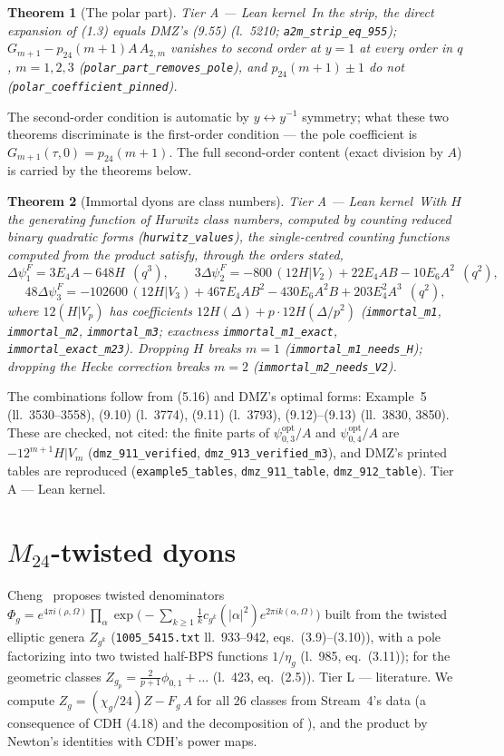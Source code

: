 \documentclass[11pt,a4paper]{article}
\newtheorem{theorem}{Theorem}[section]
\theoremstyle{remark}
\newcommand{\tierA}{\colorbox{green!15}{\textsf{\scriptsize Tier A --- Lean kernel}}}
\newcommand{\tierL}{\colorbox{blue!10}{\textsf{\scriptsize Tier L --- literature}}}
\newcommand{\lean}[1]{\texttt{#1}}
\newcommand{\Mtf}{M_{24}}
\begin{document}
\begin{theorem}[The polar part] \tierA\
In the strip, the direct expansion of (1.3) equals DMZ's (9.55) (l.~5210; \lean{a2m\_strip\_eq\_955});
$G_{m+1}-p_{24}(m+1)A\,A_{2,m}$ vanishes to second order at $y=1$ at every order in $q$, $m=1,2,3$
(\lean{polar\_part\_removes\_pole}), and $p_{24}(m+1)\pm1$ do not (\lean{polar\_coefficient\_pinned}).
\end{theorem}
The second-order condition is automatic by $y\leftrightarrow y^{-1}$ symmetry; what these two theorems
discriminate is the first-order condition --- the pole coefficient is $G_{m+1}(\tau,0)=p_{24}(m+1)$. The
full second-order content (exact division by $A$) is carried by the theorems below.

\begin{theorem}[Immortal dyons are class numbers] \tierA\
With $H$ the generating function of Hurwitz class numbers, computed by counting reduced binary quadratic
forms (\lean{hurwitz\_values}), the single-centred counting functions computed from the product satisfy,
through the orders stated,
\[
\Delta\psi_1^F=3E_4A-648H\ \ (q^3),\qquad
3\Delta\psi_2^F=-800\,(12H|V_2)+22E_4AB-10E_6A^2\ \ (q^2),
\]
\[
48\Delta\psi_3^F=-102600\,(12H|V_3)+467E_4AB^2-430E_6A^2B+203E_4^2A^3\ \ (q^2),
\]
where $12(H|V_p)$ has coefficients $12H(\Delta)+p\cdot12H(\Delta/p^2)$
(\lean{immortal\_m1}, \lean{immortal\_m2}, \lean{immortal\_m3}; exactness \lean{immortal\_m1\_exact},
\lean{immortal\_exact\_m23}). Dropping $H$ breaks $m=1$ (\lean{immortal\_m1\_needs\_H}); dropping the
Hecke correction breaks $m=2$ (\lean{immortal\_m2\_needs\_V2}).
\end{theorem}
The combinations follow from (5.16) and DMZ's optimal forms: Example~5 (ll.~3530--3558), (9.10) (l.~3774),
(9.11) (l.~3793), (9.12)--(9.13) (ll.~3830, 3850). These are checked, not cited: the finite parts of
$\psi_{0,3}^{\mathrm{opt}}/A$ and $\psi_{0,4}^{\mathrm{opt}}/A$ are $-12^{m+1}H|V_m$
(\lean{dmz\_911\_verified}, \lean{dmz\_913\_verified\_m3}), and DMZ's printed tables are reproduced
(\lean{example5\_tables}, \lean{dmz\_911\_table}, \lean{dmz\_912\_table}). \tierA.

\section{\texorpdfstring{$\Mtf$-twisted dyons}{M24-twisted dyons}}
\label{sec:twisted}
Cheng~\cite{Cheng2010} proposes twisted denominators
$\Phi_g=e^{4\pi i(\rho,\Omega)}\prod_\alpha\exp\big(-\sum_{k\ge1}\tfrac1kc_{g^k}(|\alpha|^2)e^{2\pi ik(\alpha,\Omega)}\big)$
built from the twisted elliptic genera $Z_{g^k}$ (\texttt{1005\_5415.txt} ll.~933--942, eqs.~(3.9)--(3.10)),
with a pole factorizing into two twisted half-BPS functions $1/\eta_g$ (l.~985, eq.~(3.11)); for the
geometric classes $Z_{g_p}=\tfrac2{p+1}\phi_{0,1}+\dots$ (l.~423, eq.~(2.5)). \tierL. We compute
$Z_g=(\chi_g/24)Z-F_g\,A$ for all 26 classes from Stream~4's data (a consequence of CDH (4.18) and the
decomposition of \Cref{sec:shadow}), and the product by Newton's identities with CDH's power maps.
\end{document}
